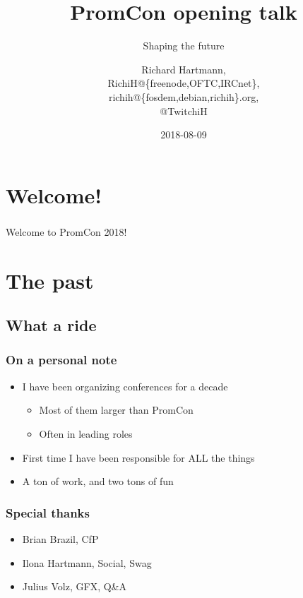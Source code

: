 \documentclass[t]{beamer}
\title{PromCon opening talk}
\subtitle{Shaping the future}
\author{Richard Hartmann,\\
RichiH@\{freenode,OFTC,IRCnet\},\\
richih@\{fosdem,debian,richih\}.org, \\
@TwitchiH}
\date{2018-08-09}
\begin{document}
\setcounter{tocdepth}{1}

\begin{frame}
	\titlepage
\end{frame}




\section{Welcome!}

\begin{frame}
	\frametitle{}
	\vfill
	Welcome to PromCon 2018!
	\vfill
\end{frame}


\section{The past}

\subsection{What a ride}

\begin{frame}
	\frametitle{On a personal note}
	\vfill
	\begin{itemize}
		\item I have been organizing conferences for a decade
		\begin{itemize}
			\item Most of them larger than PromCon
			\item Often in leading roles
		\end{itemize}
	\item First time I have been responsible for ALL the things
	\item A ton of work, and two tons of fun
	\end{itemize}
	\vfill
\end{frame}

\begin{frame}
	\frametitle{Special thanks}
	\vfill
	\begin{itemize}
		\item Brian Brazil, CfP
		\item Ilona Hartmann, Social, Swag
		\item Julius Volz, GFX, Q\&A
	\end{itemize}
	\vfill
\end{frame}
\end{document}
